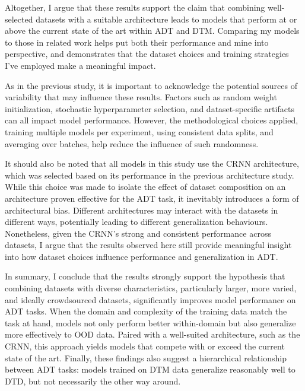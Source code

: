 Altogether, I argue that these results support the claim that combining well-selected datasets with a suitable architecture leads to models that perform at or above the current state of the art within \gls{ADT} and \gls{DTM}. Comparing my models to those in related work helps put both their performance and mine into perspective, and demonstrates that the dataset choices and training strategies I've employed make a meaningful impact.

As in the previous study, it is important to acknowledge the potential sources of variability that may influence these results. Factors such as random weight initialization, stochastic hyperparameter selection, and dataset-specific artifacts can all impact model performance. However, the methodological choices applied, training multiple models per experiment, using consistent data splits, and averaging over batches, help reduce the influence of such randomness.

It should also be noted that all models in this study use the \acrfull{CRNN} architecture, which was selected based on its performance in the previous architecture study. While this choice was made to isolate the effect of dataset composition on an architecture proven effective for the \gls{ADT} task, it inevitably introduces a form of architectural bias. Different architectures may interact with the datasets in different ways, potentially leading to different generalization behaviours. Nonetheless, given the \gls{CRNN}'s strong and consistent performance across datasets, I argue that the results observed here still provide meaningful insight into how dataset choices influence performance and generalization in \gls{ADT}.

In summary, I conclude that the results strongly support the hypothesis that combining datasets with diverse characteristics, particularly larger, more varied, and ideally crowdsourced datasets, significantly improves model performance on \gls{ADT} tasks. When the domain and complexity of the training data match the task at hand, models not only perform better within-domain but also generalize more effectively to \acrfull{OOD} data. Paired with a well-suited architecture, such as the \acrshort{CRNN}, this approach yields models that compete with or exceed the current state of the art. Finally, these findings also suggest a hierarchical relationship between \gls{ADT} tasks: models trained on \gls{DTM} data generalize reasonably well to \gls{DTD}, but not necessarily the other way around. 